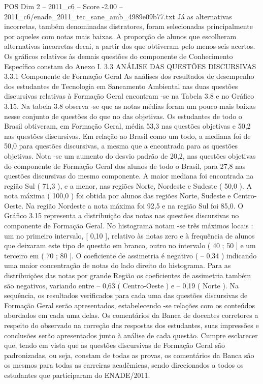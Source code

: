 \begin{textsample}{POS Dim 2 – 2011\_c6 – Score -2.00 – 2011\_c6/enade\_2011\_tec\_sane\_amb\_4989e09b77.txt}
Já as alternativas incorretas, também denominadas distratores, foram selecionadas principalmente por aqueles com notas mais baixas.
A proporção de alunos que escolheram alternativas incorretas decai, a partir dos que obtiveram pelo menos seis acertos.
Os gráficos relativos às demais questões do componente de Conhecimento Específico constam do Anexo I. 3.3 ANÁLISE DAS QUESTÕES DISCURSIVAS 3.3.1 Componente de Formação Geral As análises dos resultados de desempenho dos estudantes de Tecnologia em Saneamento Ambiental nas duas questões discursivas relativas à Formação Geral encontram -se na Tabela 3.8 e no Gráfico 3.15.
Na tabela 3.8 observa -se que as notas médias foram um pouco mais baixas nesse conjunto de questões do que no das objetivas.
Os estudantes de todo o Brasil obtiveram, em Formação Geral, média 53,3 nas questões objetivas e 50,2 nas questões discursivas.
Em relação ao Brasil como um todo, a mediana foi de 50,0 para questões discursivas, a mesma que a encontrada para as questões objetivas.
Nota -se um aumento do desvio padrão de 20,2, nas questões objetivas do componente de Formação Geral dos alunos de todo o Brasil, para 27,8 nas questões discursivas do mesmo componente.
A maior mediana foi encontrada na região Sul ( 71,3 ), e a menor, nas regiões Norte, Nordeste e Sudeste ( 50,0 ).
A nota máxima ( 100,0 ) foi obtida por alunos das regiões Norte, Sudeste e Centro-Oeste.
Na região Nordeste a nota máxima foi 92,5 e na região Sul foi 85,0.
O Gráfico 3.15 representa a distribuição das notas nas questões discursivas no componente de Formação Geral.
No histograma notam -se três máximos locais : um no primeiro intervalo, [ 0,10 ], relativo às notas zero e à frequência de alunos que deixaram este tipo de questão em branco, outro no intervalo ( 40 ; 50 ] e um terceiro em ( 70 ; 80 ].
O coeficiente de assimetria é negativo ( – 0,34 ) indicando uma maior concentração de notas do lado direito do histograma.
Para as distribuições das notas por grande Região os coeficientes de assimetria também são negativos, variando entre – 0,63 ( Centro-Oeste ) e – 0,19 ( Norte ).
Na sequência, os resultados verificados para cada uma das questões discursivas de Formação Geral serão apresentados, estabelecendo -se relações com os conteúdos abordados em cada uma delas.
Os comentários da Banca de docentes corretores a respeito do observado na correção das respostas dos estudantes, suas impressões e conclusões serão apresentados junto à análise de cada questão.
Cumpre esclarecer que, tendo em vista que as questões discursivas de Formação Geral são padronizadas, ou seja, constam de todas as provas, os comentários da Banca são os mesmos para todas as carreiras acadêmicas, sendo direcionados a todos os estudantes que participaram do ENADE/2011.

\end{textsample}
